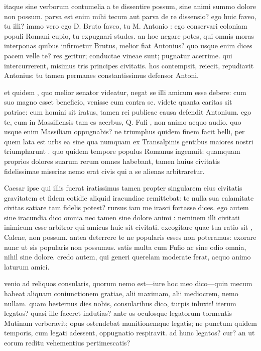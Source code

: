  itaque sine verborum contumelia a te dissentire possum, sine animi summo dolore non possum. parva est enim mihi tecum aut parva de re dissensio? ego huic faveo, tu illi? immo vero ego D. Bruto faveo, tu M. Antonio : ego conservari coloniam populi Romani cupio, tu expugnari studes. an hoc negare potes, qui omnis moras interponas quibus infirmetur Brutus, melior fiat Antonius? quo usque enim dices pacem velle te? res geritur; conductae vineae sunt; pugnatur acerrime. qui intercurrerent, misimus tris principes civitatis. hos contempsit, reiecit, repudiavit Antonius: tu tamen permanes constantissimus defensor Antoni.

 et quidem , quo melior senator videatur, negat se illi amicum esse debere: cum suo magno esset beneficio, venisse eum contra se. videte quanta caritas sit patriae: cum homini sit iratus, tamen rei publicae causa defendit Antonium. ego te, cum in Massiliensis tam es acerbus, Q. Fufi , non animo aequo audio. quo usque enim Massiliam oppugnabis? ne triumphus quidem finem facit belli, per quem lata est urbs ea sine qua numquam ex Transalpinis gentibus maiores nostri triumpharunt . quo quidem tempore populus Romanus ingemuit: quamquam proprios dolores suarum rerum omnes habebant, tamen huius civitatis fidelissimae miserias nemo erat civis qui a se alienas arbitraretur.

 Caesar ipse qui illis fuerat iratissimus tamen propter singularem eius civitatis gravitatem et fidem cotidie aliquid iracundiae remittebat: te nulla sua calamitate civitas satiare tam fidelis potest? rursus iam me irasci fortasse dices. ego autem sine iracundia dico omnia nec tamen sine dolore animi : neminem illi civitati inimicum esse arbitror qui amicus huic sit civitati. excogitare quae tua ratio sit , Calene, non possum. antea deterrere te ne popularis esses non poteramus: exorare nunc ut sis popularis non possumus. satis multa cum Fufio ac sine odio omnia, nihil sine dolore. credo autem, qui generi querelam moderate ferat, aequo animo laturum amici.

 venio ad reliquos consularis, quorum nemo est—iure hoc meo dico—quin mecum habeat aliquam coniunctionem gratiae, alii maximam, alii mediocrem, nemo nullam. quam hesternus dies nobis, consularibus dico, turpis inluxit! iterum legatos? quasi ille faceret indutias? ante os oculosque legatorum tormentis Mutinam verberavit; opus ostendebat munitionemque legatis; ne punctum quidem temporis, cum legati adessent, oppugnatio respiravit. ad hunc legatos? cur? an ut eorum reditu vehementius pertimescatis?

